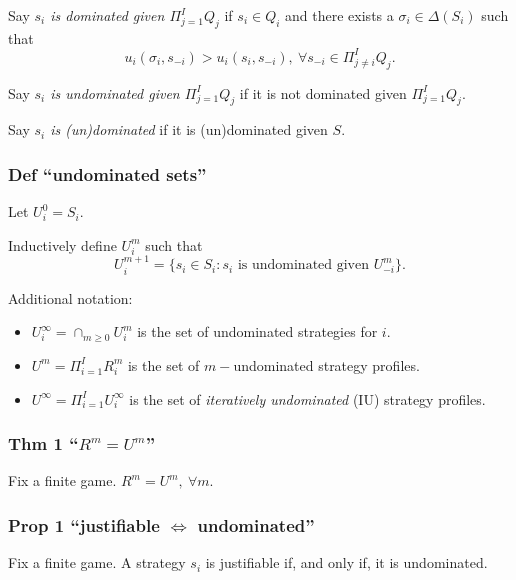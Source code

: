 \documentclass[
]{article}
\providecommand{\tightlist}{%
  \setlength{\itemsep}{0pt}\setlength{\parskip}{0pt}}
\begin{document}
Say \emph{\(s_i\) is dominated given \(\Pi_{j=1}^I Q_j\)} if
\(s_i \in Q_i\) and there exists a \(\sigma_i \in \Delta(S_i)\) such
that
\[u_i(\sigma_i,s_{-i}) > u_i(s_i,s_{-i}),~\forall s_{-i} \in \Pi_{j \neq i}^I Q_j.\]

Say \emph{\(s_i\) is undominated given \(\Pi_{j=1}^I Q_j\)} if it is not
dominated given \(\Pi_{j=1}^I Q_j\).

Say \emph{\(s_i\) is (un)dominated} if it is (un)dominated given \(S\).

\hypertarget{def-undominated-sets}{%
\subsubsection{Def ``undominated sets''}\label{def-undominated-sets}}

Let \(U_i^0 = S_i.\)

Inductively define \(U_i^m\) such that
\[U_i^{m+1} = \{s_i \in S_i: s_i \text{ is undominated given } U_{-i}^m\}.\]

Additional notation:

\begin{itemize}
\tightlist
\item
  \(U_i^\infty = \cap_{m\geq 0}U_i^m\) is the set of undominated
  strategies for \(i\).
\item
  \(U^m = \Pi_{i=1}^I R_i^m\) is the set of \(m-\)undominated strategy
  profiles.
\item
  \(U^\infty = \Pi_{i=1}^I U_i^\infty\) is the set of \emph{iteratively
  undominated} (IU) strategy profiles.
\end{itemize}

\hypertarget{thm-1-rm-um}{%
\subsubsection{\texorpdfstring{Thm 1
``\(R^m = U^m\)''}{Thm 1 ``R\^{}m = U\^{}m''}}\label{thm-1-rm-um}}

Fix a finite game. \(R^m = U^m, ~\forall m.\)

\hypertarget{prop-1-justifiable-iff-undominated}{%
\subsubsection{\texorpdfstring{Prop 1 ``justifiable \(\iff\)
undominated''}{Prop 1 ``justifiable \textbackslash iff undominated''}}\label{prop-1-justifiable-iff-undominated}}

Fix a finite game. A strategy \(s_i\) is justifiable if, and only if, it
is undominated.
\end{document}
